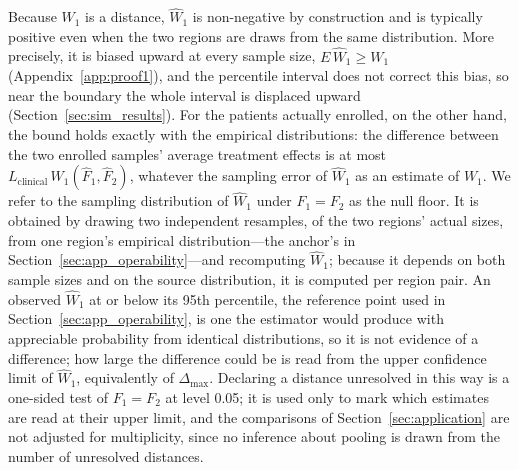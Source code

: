 \documentclass[AMA,Times1COL]{WileyNJDv5}
\begin{document}
Because $W_1$ is a distance, $\widehat{W}_1$ is non-negative by construction and is typically positive even when the two regions are draws from the same distribution. More precisely, it is biased upward at every sample size, $E\,\widehat{W}_1 \geq W_1$ (Appendix~\ref{app:proof1}), and the percentile interval does not correct this bias, so near the boundary the whole interval is displaced upward (Section~\ref{sec:sim_results}). For the patients actually enrolled, on the other hand, the bound holds exactly with the empirical distributions: the difference between the two enrolled samples' average treatment effects is at most $L_{\text{clinical}}\,W_1(\hat{F}_1, \hat{F}_2)$, whatever the sampling error of $\widehat{W}_1$ as an estimate of $W_1$. We refer to the sampling distribution of $\widehat{W}_1$ under $F_1 = F_2$ as the null floor. It is obtained by drawing two independent resamples, of the two regions' actual sizes, from one region's empirical distribution---the anchor's in Section~\ref{sec:app_operability}---and recomputing $\widehat{W}_1$; because it depends on both sample sizes and on the source distribution, it is computed per region pair. An observed $\widehat{W}_1$ at or below its 95th percentile, the reference point used in Section~\ref{sec:app_operability}, is one the estimator would produce with appreciable probability from identical distributions, so it is not evidence of a difference; how large the difference could be is read from the upper confidence limit of $\widehat{W}_1$, equivalently of $\Delta_{\max}$. Declaring a distance unresolved in this way is a one-sided test of $F_1 = F_2$ at level 0.05; it is used only to mark which estimates are read at their upper limit, and the comparisons of Section~\ref{sec:application} are not adjusted for multiplicity, since no inference about pooling is drawn from the number of unresolved distances.
\end{document}
